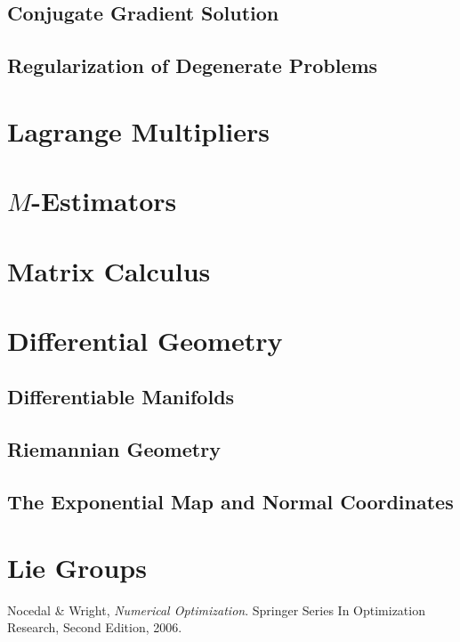 \documentclass{amsart}
\begin{document}
\subsection{Conjugate Gradient Solution}
\subsection{Regularization of Degenerate Problems}

\section{Lagrange Multipliers}

\section {$M$-Estimators}

\section{Matrix Calculus}

\section{Differential Geometry}
\subsection{Differentiable Manifolds}
\subsection{Riemannian Geometry}
\subsection{The Exponential Map and Normal Coordinates}

\section{Lie Groups}

\begin{thebibliography}{999}

Nocedal \& Wright,
\emph{Numerical Optimization}.
Springer Series In Optimization Research,
Second Edition,
2006.

\end{thebibliography}
\end{document}
